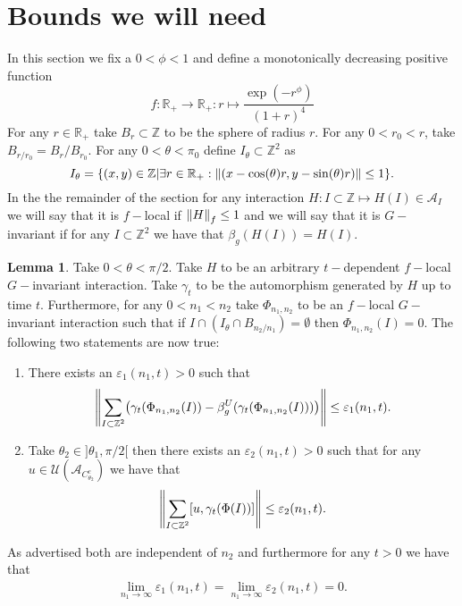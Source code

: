 \documentclass[12pt,a4paper,twoside]{article}
\let\originalleft\left
\let\originalright\right
\renewcommand{\left}{\mathopen{}\mathclose\bgroup\originalleft}
\renewcommand{\right}{\aftergroup\egroup\originalright}
\newcommand{\UU}{\mathcal U}
\newcommand{\ZZ}{\mathbb Z}
\renewcommand{\AA}{\mathcal A}
\newcommand{\RR}{\mathbb R}
\theoremstyle{definition}
\newtheorem{lemma}[theorem]{Lemma}
\numberwithin{equation}{section}
\begin{document}
\section{Bounds we will need}
In this section we fix a $0<\phi<1$ and define a monotonically decreasing positive function
\begin{equation}
	f:\RR_+\rightarrow \RR_+:r\mapsto \frac{\exp(-r^{\phi})}{(1+r)^{4}}
\end{equation}
For any $r\in\RR_+$ take $B_r\subset\ZZ$ to be the sphere of radius $r$. For any $0<r_0<r$, take $B_{r/r_0}=B_{r}/B_{r_0}$. For any $0<\theta<\pi_0$ define $I_{\theta}\subset \ZZ^2$ as
\begin{equation}
	I_{\theta}=\{(x,y)\in\ZZ|\exists r\in\RR_+:\norm{(x-\cos(\theta)r,y-\sin(\theta)r)}\leq 1\}.
\end{equation}
In the the remainder of the section for any interaction $H:I\subset\ZZ\mapsto H(I)\in \AA_I$ we will say that it is $f-$local if $\norm{H}_f\leq 1$ and we will say that it is $G-$invariant if for any $I\subset \ZZ^{2}$ we have that $\beta_g(H(I))=H(I).$
\begin{lemma}\label{lem:Bound1}
	Take $0<\theta<\pi/2$. Take $H$ to be an arbitrary $t-$dependent $f-$local $G-$invariant interaction. Take $\gamma_t$ to be the automorphism generated by $H$ up to time $t$. Furthermore, for any $0<n_1<n_2$ take $\Phi_{n_1,n_2}$ to be an $f-$local $G-$invariant interaction such that if $I\cap (I_\theta\cap B_{n_2/n_1})=\emptyset$ then $\Phi_{n_1,n_2}(I)=0$. The following two statements are now true:
	\begin{enumerate}
		\item There exists an $\varepsilon_{1}(n_1,t)>0$ such that
		\begin{equation}
			\norm{\sum_{I\subset \ZZ^2}\left(\gamma_t(\Phi_{n_1,n_2}(I))-\beta_g^U(\gamma_t(\Phi_{n_1,n_2}(I)))\right)}\leq \varepsilon_{1}(n_1,t).
		\end{equation}
		\item Take $\theta_2\in]\theta_1,\pi/2[$ then there exists an $\varepsilon_{2}(n_1,t)>0$ such that for any $u\in\UU(\AA_{C_{\theta_2}^c})$ we have that
		\begin{equation}
			\norm{\sum_{I\subset \ZZ^2}[u,\gamma_t(\Phi(I))]}\leq \varepsilon_2(n_1,t).
		\end{equation}
	\end{enumerate}
	As advertised both are independent of $n_2$ and furthermore for any $t>0$ we have that
	\begin{align}
		\lim_{n_1\rightarrow\infty}\varepsilon_{1}(n_1,t)=\lim_{n_1\rightarrow\infty}\varepsilon_{2}(n_1,t)=0.
	\end{align}
\end{lemma}
\end{document}
